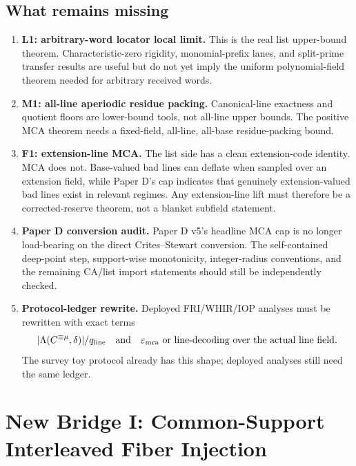 \documentclass[11pt]{article}
\newcommand{\qline}{q_{\rm line}}
\newcommand{\epsmca}{\varepsilon_{\rm mca}}
\newcommand{\Lam}{\Lambda}
\begin{document}
\subsection{What remains missing}

\begin{enumerate}
\item \textbf{L1: arbitrary-word locator local limit.}  This is the real list
upper-bound theorem.  Characteristic-zero rigidity, monomial-prefix lanes, and
split-prime transfer results are useful but do not yet imply the uniform
polynomial-field theorem needed for arbitrary received words.

\item \textbf{M1: all-line aperiodic residue packing.}  Canonical-line exactness
and quotient floors are lower-bound tools, not all-line upper bounds.  The
positive MCA theorem needs a fixed-field, all-line, all-base residue-packing
bound.

\item \textbf{F1: extension-line MCA.}  The list side has a clean extension-code
identity.  MCA does not.  Base-valued bad lines can deflate when sampled over an
extension field, while Paper D's cap indicates that genuinely extension-valued
bad lines exist in relevant regimes.  Any extension-line lift must therefore be
a corrected-reserve theorem, not a blanket subfield statement.

\item \textbf{Paper D conversion audit.}  Paper D v5's headline MCA cap is no
longer load-bearing on the direct Crites--Stewart conversion.  The self-contained
deep-point step, support-wise monotonicity, integer-radius conventions, and the
remaining CA/list import statements should still be independently checked.

\item \textbf{Protocol-ledger rewrite.}  Deployed FRI/WHIR/IOP analyses must be
rewritten with exact terms
\[
  |\Lam(C^{\equiv\mu},\delta)|/\qline
  \quad\text{and}\quad
  \epsmca\text{ or line-decoding over the actual line field}.
\]
The survey toy protocol already has this shape; deployed analyses still need the
same ledger.
\end{enumerate}

\section{New Bridge I: Common-Support Interleaved Fiber Injection}
\label{sec:common-support-interleaved-fiber-injection}
\end{document}

